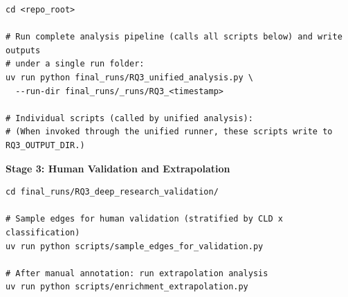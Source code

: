 \begin{verbatim}
cd <repo_root>

# Run complete analysis pipeline (calls all scripts below) and write outputs
# under a single run folder:
uv run python final_runs/RQ3_unified_analysis.py \
  --run-dir final_runs/_runs/RQ3_<timestamp>

# Individual scripts (called by unified analysis):
# (When invoked through the unified runner, these scripts write to RQ3_OUTPUT_DIR.)
\end{verbatim}

\textbf{Stage 3: Human Validation and Extrapolation}

\begin{verbatim}
cd final_runs/RQ3_deep_research_validation/

# Sample edges for human validation (stratified by CLD x classification)
uv run python scripts/sample_edges_for_validation.py

# After manual annotation: run extrapolation analysis
uv run python scripts/enrichment_extrapolation.py
\end{verbatim}

